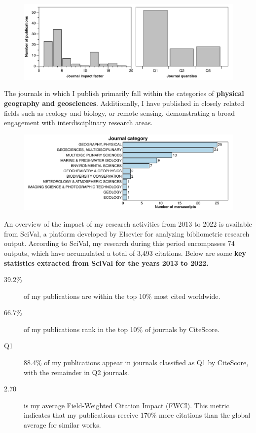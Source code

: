 \documentclass[11pt]{article}
\begin{document}
\begin{figure}[h]
\centering
\includegraphics[width=\textwidth]{img/Quantiles.pdf}
\end{figure}

{\normalfont The journals in which I publish primarily fall within the categories of \textbf{physical geography and geosciences}. Additionally, I have published in closely related fields such as ecology and biology, or remote sensing, demonstrating a broad engagement with interdisciplinary research areas.}

\begin{figure}[h]
\centering
\includegraphics[width=\textwidth]{img/topics.pdf}
\end{figure}
\newpage
{\normalfont An overview of the impact of my research activities from 2013 to 2022 is available from SciVal, a platform developed by Elsevier for analyzing bibliometric research output. According to SciVal, my research during this period encompasses 74 outputs, which have accumulated a total of 3,493 citations. Below are some \textbf{key statistics extracted from SciVal for the years 2013 to 2022.}}
\smallskip

{\footnotesize 
\begin{description}
  \item [39.2\%] of my publications are within the top 10\% most cited worldwide.
  \item [66.7\%] of my publications rank in the top 10\% of journals by CiteScore.
  \item [Q1] 88.4\% of my publications appear in journals classified as Q1 by CiteScore, with the remainder in Q2 journals.
  \item [2.70] is my average Field-Weighted Citation Impact (FWCI). This metric indicates that my publications receive 170\% more citations than the global average for similar works.
\end{description}}
\end{document}
